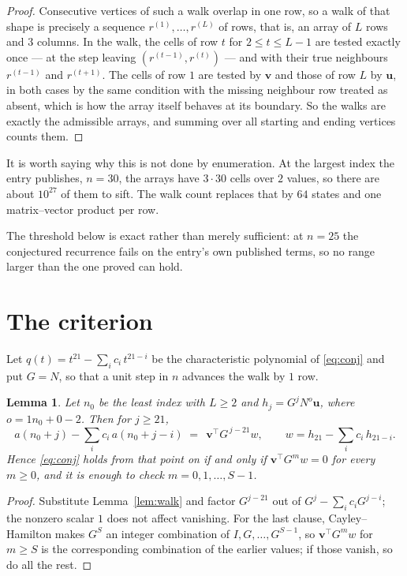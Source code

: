 \documentclass[11pt,a4paper]{article}
\theoremstyle{plain}
\newtheorem{lemma}[theorem]{Lemma}
\theoremstyle{definition}
\begin{document}
\begin{proof}
Consecutive vertices of such a walk overlap in one row, so a walk of that shape is
precisely a sequence $r^{(1)},\dots,r^{(L)}$ of rows, that is, an array of $L$ rows
and $3$ columns. In the walk, the cells of row $t$ for $2\le t\le L-1$ are tested
exactly once --- at the step leaving $(r^{(t-1)},r^{(t)})$ --- and with their true
neighbours $r^{(t-1)}$ and $r^{(t+1)}$. The cells of row $1$ are tested by
$\mathbf{v}$ and those of row $L$ by $\mathbf{u}$, in both cases by the same condition
with the missing neighbour row treated as absent, which is how the array itself behaves at
its boundary. So the walks are exactly the admissible arrays, and summing over all starting
and ending vertices counts them.
\end{proof}


It is worth saying why this is not done by enumeration. At the largest index the entry
publishes, $n=30$, the arrays have $3\cdot30$ cells over
$2$ values, so there are about $10^{27}$ of them to sift. The
walk count replaces that by $64$ states and one matrix--vector product per row.

The threshold below is exact rather than merely sufficient: at $n=25$ the conjectured
recurrence fails on the entry's own published terms, so no range larger than the one proved
can hold.
\section{The criterion}

Let $q(t)=t^{21}-\sum_i c_i\,t^{21-i}$ be the characteristic polynomial of
\eqref{eq:conj} and put $G=N$, so that a unit step in $n$ advances the walk by
$1$ row.

\begin{lemma}\label{lem:crit}
Let $n_0$ be the least index with $L\ge2$ and $h_j=G^{j}N^{o}\mathbf{u}$, where
$o=1n_0+0-2$. Then for $j\ge21$,
\[
a(n_0+j)-\sum_i c_i\,a(n_0+j-i)\;=\;\,\mathbf{v}^{\!\top}G^{\,j-21}w,
\qquad w=h_{21}-\sum_i c_i\,h_{21-i} .
\]
Hence \eqref{eq:conj} holds from that point on if and only if
$\mathbf{v}^{\!\top}G^{m}w=0$ for every $m\ge0$, and it is enough to check
$m=0,1,\dots,S-1$.
\end{lemma}

\begin{proof}
Substitute Lemma~\ref{lem:walk} and factor $G^{j-21}$ out of
$G^{j}-\sum_ic_iG^{j-i}$; the nonzero scalar $1$ does not affect
vanishing. For the last clause, Cayley--Hamilton makes $G^{S}$ an integer combination of
$I,G,\dots,G^{S-1}$, so $\mathbf{v}^{\!\top}G^{m}w$ for $m\ge S$ is the corresponding
combination of the earlier values; if those vanish, so do all the rest.
\end{proof}
\end{document}
